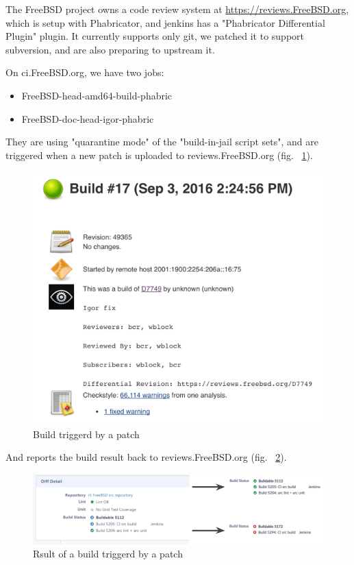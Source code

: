 \documentclass[a4paper,twocolumn,10pt]{article}
\begin{document}
The FreeBSD project owns a code review system at \url{https://reviews.FreeBSD.org},
which is setup with Phabricator, and jenkins has a "Phabricator Differential
Plugin" plugin. It currently supports only git, we patched it to support
subversion, and are also preparing to upstream it.

On ci.FreeBSD.org, we have two jobs:

\begin{itemize}
\item FreeBSD-head-amd64-build-phabric
\item FreeBSD-doc-head-igor-phabric
\end{itemize}

They are using "quarantine mode" of the "build-in-jail script sets", and are
triggered when a new patch is uploaded to reviews.FreeBSD.org (fig.
~\ref{build-patch}).

\begin{figure}
\includegraphics{build-patch.png}
\caption{Build triggerd by a patch}
\label{build-patch}
\end{figure}

And reports the build result back to reviews.FreeBSD.org (fig.
~\ref{patch-build-result}).

\begin{figure}
\includegraphics[width=\textwidth]{patch-build-result.png}
\caption{Rsult of a build triggerd by a patch}
\label{patch-build-result}
\end{figure}
\end{document}
